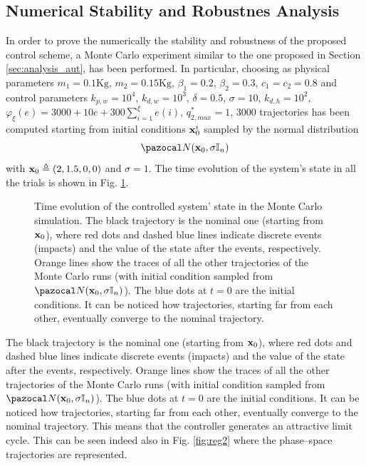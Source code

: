 \subsection{Numerical Stability and Robustnes Analysis}
%
In order to prove the numerically the stability and robustness of the proposed control scheme, a Monte Carlo experiment similar to the one proposed in Section \ref{sec:analysis_aut}, has been performed. In particular, choosing as physical parameters $m_1=0.1\text{Kg}$, $m_2=0.15\text{Kg}$, $\beta_1=0.2$, $\beta_2=0.3$, $c_1=c_2=0.8$ and control parameters $k_{p,w} = 10^4$, $k_{d,w} = 10^3$, $\delta = 0.5$, $\sigma = 10$, $k_{d,h} = 10^2$, $\varphi_\xi(e) = 3000 + 10e + 300\sum_{i = 1}^{\xi}e(i)$, $q_{2,max}^* = 1$, 3000 trajectories has been computed starting from initial conditions $\mathbf{x}_0^i$ sampled by the normal distribution
%
\begin{equation}
    \N(\xb_0,\sigma\mathbb{I}_n)
\end{equation}
%
with $\mathbf{x}_0\triangleq(2,1.5,0,0)$ and $\sigma=1$. The time evolution of the system's state in all the trials is shown in Fig. \ref{fig:reg1}.
%
\begin{figure}[h]
    \centering
    \caption[Time evolution of the controlled system' state in the Monte Carlo simulation]{Time evolution of the controlled system' state in the Monte Carlo simulation. The black trajectory is the nominal one (starting from $\mathbf{x}_0$), where red dots and dashed blue lines indicate discrete events (impacts) and the value of the state after the events, respectively. Orange lines show the traces of all the other trajectories of the Monte Carlo runs (with initial condition sampled from $\N(\xb_0,\sigma\mathbb{I}_n)$). The blue dots at $t=0$ are the initial conditions. It can be noticed how trajectories, starting far from each other, eventually converge to the nominal trajectory.}
    \label{fig:reg1}
\end{figure}
%
The black trajectory is the nominal one (starting from $\mathbf{x}_0$), where red dots and dashed blue lines indicate discrete events (impacts) and the value of the state after the events, respectively. Orange lines show the traces of all the other trajectories of the Monte Carlo runs (with initial condition sampled from $\N(\xb_0,\sigma\mathbb{I}_n)$). The blue dots at $t=0$ are the initial conditions. It can be noticed how trajectories, starting far from each other, eventually converge to the nominal trajectory. This means that the controller generates an attractive limit cycle. This can be seen indeed also in Fig. \ref{fig:reg2} where the phase--space trajectories are represented.
